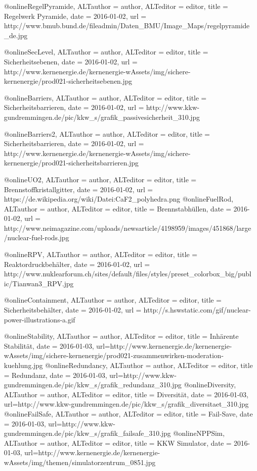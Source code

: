 @online{RegelPyramide,
	ALTauthor = {author},
	ALTeditor = {editor},
	title = {Regelwerk Pyramide},
	date = {2016-01-02},
	url = {http://www.bmub.bund.de/fileadmin/Daten_BMU/Image_Maps/regelpyramide_de.jpg}
}

@online{SecLevel,
	ALTauthor = {author},
	ALTeditor = {editor},
	title = {Sicherheitsebenen},
	date = {2016-01-02},
	url = {http://www.kernenergie.de/kernenergie-wAssets/img/sichere-kernenergie/prod021-sicherheitsebenen.jpg}
}

@online{Barriers,
	ALTauthor = {author},
	ALTeditor = {editor},
	title = {Sicherheitsbarrieren},
	date = {2016-01-02},
	url = {http://www.kkw-gundremmingen.de/pic/kkw_s/grafik_passivesicherheit_310.jpg}
}

@online{Barriers2,
	ALTauthor = {author},
	ALTeditor = {editor},
	title = {Sicherheitsbarrieren},
	date = {2016-01-02},
	url = {http://www.kernenergie.de/kernenergie-wAssets/img/sichere-kernenergie/prod021-sicherheitsbarrieren.jpg}
}

@online{UO2,
	ALTauthor = {author},
	ALTeditor = {editor},
	title = {Brennstoffkristallgitter},
	date = {2016-01-02},
	url = {https://de.wikipedia.org/wiki/Datei:CaF2_polyhedra.png}
}
@online{FuelRod,
	ALTauthor = {author},
	ALTeditor = {editor},
	title = {Brennstabhüllen},
	date = {2016-01-02},
	url = {http://www.neimagazine.com/uploads/newsarticle/4198959/images/451868/large/nuclear-fuel-rods.jpg}
}

@online{RPV,
	ALTauthor = {author},
	ALTeditor = {editor},
	title = {Reaktordruckbehälter},
	date = {2016-01-02},
	url = {http://www.nuklearforum.ch/sites/default/files/styles/preset_colorbox_big/public/Tianwan3_RPV.jpg}
}

@online{Containment,
	ALTauthor = {author},
	ALTeditor = {editor},
	title = {Sicherheitsbehälter},
	date = {2016-01-02},
	url = {http://s.hswstatic.com/gif/nuclear-power-illustrations-a.gif}
}


@online{Stability,
	ALTauthor = {author},
	ALTeditor = {editor},
	title = {Inhärente Stabilität},
	date = {2016-01-03},
	url={http://www.kernenergie.de/kernenergie-wAssets/img/sichere-kernenergie/prod021-zusammenwirken-moderation-kuehlung.jpg}
}
@online{Redundancy,
	ALTauthor = {author},
	ALTeditor = {editor},
	title = {Redundanz},
	date = {2016-01-03},
	url={http://www.kkw-gundremmingen.de/pic/kkw_s/grafik_redundanz_310.jpg}
}
@online{Diversity,
	ALTauthor = {author},
	ALTeditor = {editor},
	title = {Diversität},
	date = {2016-01-03},
	url={http://www.kkw-gundremmingen.de/pic/kkw_s/grafik_diversitaet_310.jpg}
}
@online{FailSafe,
	ALTauthor = {author},
	ALTeditor = {editor},
	title = {Fail-Save},
	date = {2016-01-03},
	url={http://www.kkw-gundremmingen.de/pic/kkw_s/grafik_failsafe_310.jpg}
}
@online{NPPSim,
	ALTauthor = {author},
	ALTeditor = {editor},
	title = {KKW Simulator},
	date = {2016-01-03},
	url={http://www.kernenergie.de/kernenergie-wAssets/img/themen/simulatorzentrum_0851.jpg}
}

